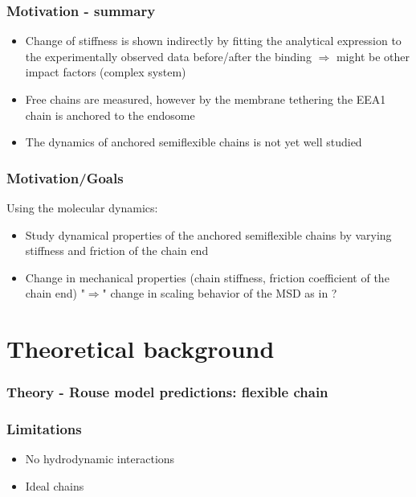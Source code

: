 \documentclass[handout]{beamer}
\begin{document}
\begin{frame}
\end{frame}


\begin{frame}
    \frametitle{Motivation - summary}
    \begin{itemize}
        \item Change of stiffness is shown indirectly by fitting the 
        analytical expression to the experimentally observed data before/after
        the binding $\Rightarrow$ might be other impact factors (complex system)
        \item Free chains are measured, however by the membrane tethering the EEA1 
        chain is anchored to the endosome
        \item The dynamics of anchored semiflexible chains is not yet well studied 
    \end{itemize} 
\end{frame}


\begin{frame}
    \frametitle{Motivation/Goals}

    Using the molecular dynamics:
    \vspace{0.5cm}
    \begin{itemize}
        \item Study dynamical properties of the anchored
        semiflexible chains by varying stiffness and friction of the chain end
        \item Change in mechanical properties (chain stiffness, friction coefficient of the chain end)
        "$\Rightarrow$" change in scaling behavior of the MSD as in \cite{Singh:2022}? 
    \end{itemize}

\end{frame}

\section{Theoretical background}

\begin{frame}
    \frametitle{Theory - Rouse model predictions: flexible chain}
    
\end{frame}

\begin{frame}
    \frametitle{Limitations}

    \begin{itemize}
        \item No hydrodynamic interactions
        \item Ideal chains
    \end{itemize}

\end{frame}
\end{document}
